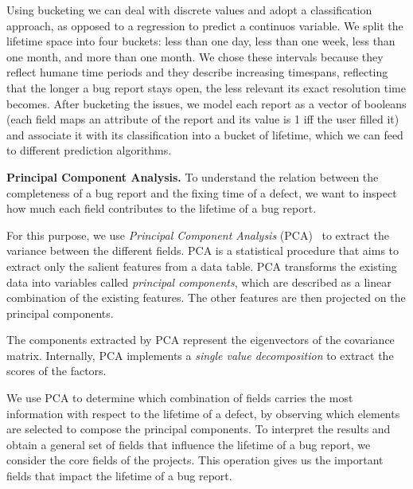  Using bucketing we can deal with discrete values and adopt a classification approach, as opposed to a regression to predict a continuos variable. We split the lifetime space into four buckets: less than one day, less than one week, less than one month, and more than one month. We chose these intervals because they reflect humane time periods and they describe increasing timespans, reflecting that the longer a bug report stays open, the less relevant its exact resolution time becomes. After bucketing the issues, we model each report as a vector of booleans (each field maps an attribute of the report and its value is 1 iff the user filled it) and associate it with its classification into a bucket of lifetime, which we can feed to different prediction algorithms.


{\bfseries Principal Component Analysis.} To understand the relation between the completeness of a bug report and the fixing time of a defect, we want to inspect how much each field contributes to  the lifetime of a bug report. 

For this purpose, we use \emph{Principal Component Analysis} (PCA)~\cite{abdi2010} to extract the variance between the different fields. PCA is a statistical procedure that aims to extract only the salient features from a data table. PCA transforms the existing data into variables called \emph{principal components}, which are described as a linear combination of the existing features. The other features are then projected on the principal components.


The components extracted by PCA represent the eigenvectors of the covariance matrix. Internally, PCA implements a \emph{single value decomposition} to extract the scores of the factors. %

We use PCA to determine which combination of fields carries the most information with respect to the lifetime of a defect, by observing which elements are selected to compose the principal components. To interpret the results and obtain a general set of fields that influence the lifetime of a bug report, we consider the core fields of the projects. This operation gives us the important fields that impact the lifetime of a bug report.


